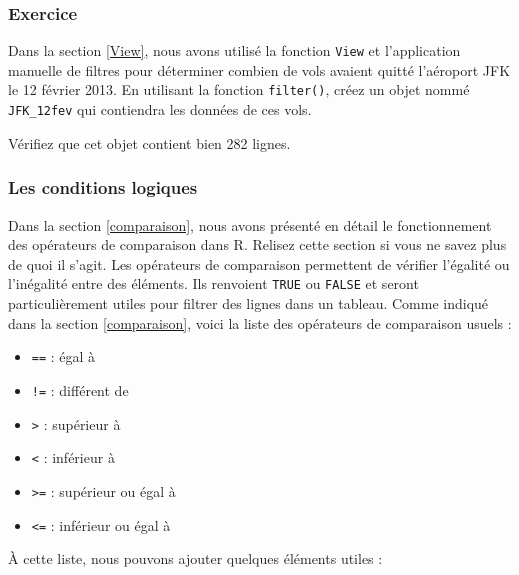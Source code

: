 \documentclass[a4paperpaper,]{article}
\providecommand{\tightlist}{%
  \setlength{\itemsep}{0pt}\setlength{\parskip}{0pt}}
\begin{document}
\hypertarget{exercice-1}{%
\subsubsection{Exercice}\label{exercice-1}}

Dans la section \ref{View}, nous avons utilisé la fonction \texttt{View} et l'application manuelle de filtres pour déterminer combien de vols avaient quitté l'aéroport JFK le 12 février 2013. En utilisant la fonction \texttt{filter()}, créez un objet nommé \texttt{JFK\_12fev} qui contiendra les données de ces vols.

Vérifiez que cet objet contient bien 282 lignes.

\hypertarget{les-conditions-logiques}{%
\subsubsection{Les conditions logiques}\label{les-conditions-logiques}}

Dans la section \ref{comparaison}, nous avons présenté en détail le fonctionnement des opérateurs de comparaison dans R. Relisez cette section si vous ne savez plus de quoi il s'agit. Les opérateurs de comparaison permettent de vérifier l'égalité ou l'inégalité entre des éléments. Ils renvoient \texttt{TRUE} ou \texttt{FALSE} et seront particulièrement utiles pour filtrer des lignes dans un tableau. Comme indiqué dans la section \ref{comparaison}, voici la liste des opérateurs de comparaison usuels :

\begin{itemize}
\tightlist
\item
  \texttt{==} : égal à
\item
  \texttt{!=} : différent de
\item
  \texttt{\textgreater{}} : supérieur à
\item
  \texttt{\textless{}} : inférieur à
\item
  \texttt{\textgreater{}=} : supérieur ou égal à
\item
  \texttt{\textless{}=} : inférieur ou égal à
\end{itemize}

À cette liste, nous pouvons ajouter quelques éléments utiles :
\end{document}
